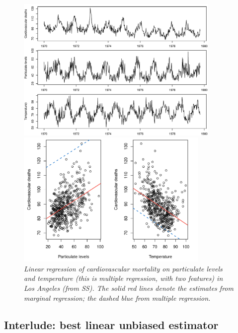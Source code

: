 \documentclass{article}
\begin{document}
\begin{itemize}
\begin{figure}[p]
\centering
\includegraphics[width=0.875\textwidth]{fig/cardio-mult-1.pdf} 

\bigskip\bigskip
\includegraphics[width=0.825\textwidth]{fig/cardio-mult-2.pdf}

\caption{\it Linear regression of cardiovascular mortality on particulate levels
  and temperature (this is multiple regression, with two features) in Los
  Angeles (from SS). The solid red lines denote the estimates from marginal
  regression; the dashed blue from multiple regression.} 
\label{fig:cardio_mult}
\end{figure}
\end{itemize}

\subsection{Interlude: best linear unbiased estimator}

\def\WN{\mathrm{WN}}
\def\MSE{\mathrm{MSE}}
\end{document}
